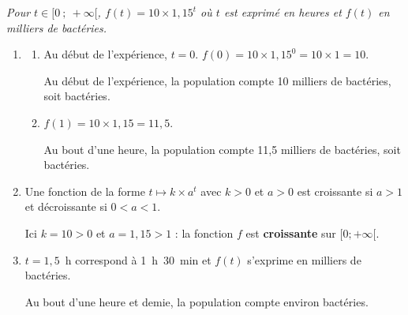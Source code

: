 \emph{Pour $t \in [0~;~+\infty[$, $f(t) = 10 \times 1,15^{t}$ où $t$ est exprimé en heures et
$f(t)$ en milliers de bactéries.}

\begin{enumerate}
	\item
	\begin{enumerate}
		\item Au début de l'expérience, $t=0$.
		$f(0) = 10 \times 1,15^{0} = 10 \times 1 = 10$.

		Au début de l'expérience, la population compte 10 milliers de bactéries, soit
		 bactéries.

		\item $f(1) = 10 \times 1,15 = 11,5$.

		Au bout d'une heure, la population compte 11,5 milliers de bactéries, soit
		 bactéries.
	\end{enumerate}

	\item Une fonction de la forme $t \longmapsto k \times a^t$ avec $k > 0$ et $a > 0$ est croissante
	si $a > 1$ et décroissante si $0 < a < 1$.

	Ici $k = 10 > 0$ et $a = 1,15 > 1$ : la fonction $f$ est \textbf{croissante} sur $[0 ; +\infty[$.

	\item $t = 1,5$~h correspond à 1~h~30~min et $f(t)$ s'exprime en milliers de bactéries.

	Au bout d'une heure et demie, la population compte environ  bactéries.
\end{enumerate}
